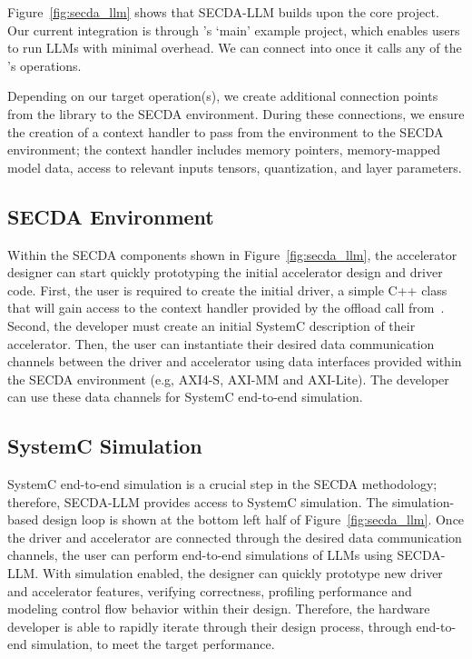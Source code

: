 Figure~\ref{fig:secda_llm} shows that SECDA-LLM builds upon the core \LPP project.
Our current integration is through \LPP's `main' example project, which enables users to run LLMs with minimal overhead.
We can connect into \LPP once it calls any of the \GGML's operations.

Depending on our target operation(s), we create additional connection points from the \GGML library to the SECDA environment.
During these connections, we ensure the creation of a context handler to pass from the \GGML environment to the SECDA environment; the context handler includes memory pointers, memory-mapped model data, access to relevant inputs tensors, quantization, and layer parameters.



\subsection{SECDA Environment}

Within the SECDA components shown in Figure~\ref{fig:secda_llm}, the accelerator designer can start quickly prototyping the initial accelerator design and driver code.
First, the user is required to create the initial driver, a simple C++ class that will gain access to the context handler provided by the offload call from~\GGML.
Second, the developer must create an initial SystemC description of their accelerator.
Then, the user can instantiate their desired data communication channels between the driver and accelerator using data interfaces provided within the SECDA environment (e.g, AXI4-S, AXI-MM and AXI-Lite).
The developer can use these data channels for SystemC end-to-end simulation.



\subsection{SystemC Simulation}

SystemC end-to-end simulation is a crucial step in the SECDA methodology; therefore, SECDA-LLM provides access to SystemC simulation.
The simulation-based design loop is shown at the bottom left half of Figure~\ref{fig:secda_llm}.
Once the driver and accelerator are connected through the desired data communication channels, the user can perform end-to-end simulations of LLMs using SECDA-LLM.
With simulation enabled, the designer can quickly prototype new driver and accelerator features, verifying correctness, profiling performance and modeling control flow behavior within their design.
Therefore, the hardware developer is able to rapidly iterate through their design process, through end-to-end simulation, to meet the target performance.


